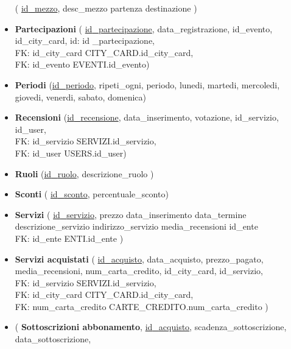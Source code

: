 \begin{itemize}
    (
    \underline{id{\_}mezzo},
    desc{\_}mezzo
    partenza
    destinazione
    )
    \item 
    \textbf{Partecipazioni}
    (
    \underline{id{\_}partecipazione},
    data{\_}registrazione,
    id{\_}evento,
    id{\_}city{\_}card,
    id: id {\_}partecipazione,\\
    FK: id{\_}city{\_}card \textrightarrow CITY{\_}CARD.id{\_}city{\_}card,\\
    FK: id{\_}evento \textrightarrow EVENTI.id{\_}evento)
    \item   
    \textbf{Periodi}
    (\underline{id{\_}periodo},
    ripeti{\_}ogni,
    periodo,
    lunedi,
    martedi,
    mercoledi,
    giovedi,
    venerdi,
    sabato,
    domenica)
    \item 
    \textbf{Recensioni}
    (\underline{id{\_}recensione},
    data{\_}inserimento,
    votazione,
    id{\_}servizio,
    id{\_}user,\\
    FK: id{\_}servizio \textrightarrow SERVIZI.id{\_}servizio,\\
    FK: id{\_}user \textrightarrow USERS.id{\_}user)
    \item 
    \textbf{Ruoli}
    (\underline{id{\_}ruolo},
    descrizione{\_}ruolo
    )
    \item 
    \textbf{Sconti}
    (
    \underline{id{\_}sconto},
    percentuale{\_}sconto)
    \item 
    \textbf{Servizi}
    (
    \underline{id{\_}servizio},
    prezzo
    data{\_}inserimento
    data{\_}termine
    descrizione{\_}servizio
    indirizzo{\_}servizio
    media{\_}recensioni
    id{\_}ente\\
    FK: id{\_}ente \textrightarrow ENTI.id{\_}ente
    )
    \item 
    \textbf{Servizi acquistati}
    (
    \underline{id{\_}acquisto},
    data{\_}acquisto,
    prezzo{\_}pagato,
    media{\_}recensioni,
    num{\_}carta{\_}credito,
    id{\_}city{\_}card,
    id{\_}servizio,\\
    FK: id{\_}servizio \textrightarrow SERVIZI.id{\_}servizio,\\
    FK: id{\_}city{\_}card \textrightarrow CITY{\_}CARD.id{\_}city{\_}card,\\
    FK: num{\_}carta{\_}credito \textrightarrow CARTE{\_}CREDITO.num{\_}carta{\_}credito
    )
    \item 
    (
    \textbf{Sottoscrizioni abbonamento},
    \underline{id{\_}acquisto},
    scadenza{\_}sottoscrizione,
    data{\_}sottoscrizione,\\

\end{itemize}
